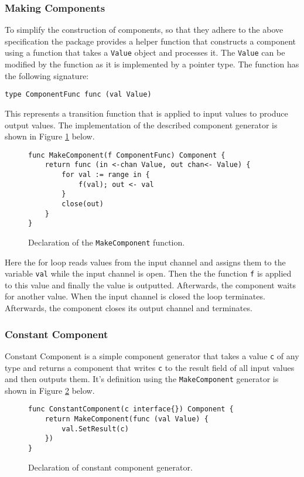 \subsubsection{Making Components}
To simplify the construction of components, so that they adhere to 
the above specification the package provides a helper function that 
constructs a component using a function that takes a \texttt{Value} object 
and processes it. The \texttt{Value} can be modified by the function as it is 
implemented by a pointer type. The function has the following signature:
\begin{lstlisting}
type ComponentFunc func (val Value)
\end{lstlisting}
This represents a transition function that is applied to input values
to produce output values.
The implementation of the described component generator is shown in 
Figure \ref{fig:MakeComponent} below.
\begin{figure}[h]
\centering
\begin{lstlisting}
func MakeComponent(f ComponentFunc) Component {
    return func (in <-chan Value, out chan<- Value) {
        for val := range in {
            f(val); out <- val
        }
        close(out)
    }
}
\end{lstlisting}
\caption[scale=1.0]{Declaration of the \texttt{MakeComponent} function.}
\label{fig:MakeComponent}
\end{figure}

Here the for loop reads values from the input channel and assigns them
to the variable \texttt{val} while the input channel is open. Then the 
the function \texttt{f} is applied to this value and finally the value is outputted.
Afterwards, the component waits for another value. When the input channel
is closed the loop terminates. Afterwards, the component closes its output channel
and terminates.

\subsubsection{Constant Component}
Constant Component is a simple component generator that takes a value \texttt{c}
of any type and returns a component that writes \texttt{c} to the result field of 
all input values and then outputs them. It's definition using the 
\texttt{MakeComponent} generator is shown in Figure 
\ref{fig:ConstantComponent} below.
\begin{figure}[h]
\centering
\begin{lstlisting}
func ConstantComponent(c interface{}) Component {
    return MakeComponent(func (val Value) {
        val.SetResult(c)
    })
}
\end{lstlisting}
\caption[scale=1.0]{Declaration of constant component generator.}
\label{fig:ConstantComponent}
\end{figure}

